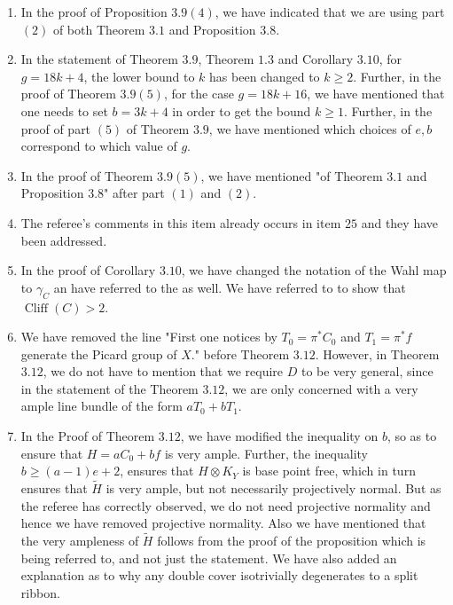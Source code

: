 \documentclass[11pt,twoside]{amsart}
\theoremstyle{plain}
\numberwithin{equation}{section}
\theoremstyle{definition}
\begin{document}
\begin{enumerate}
\item[$(24)$] In the proof of Proposition $3.9 (4)$, we have indicated that we are using part $(2)$ of both Theorem $3.1$ and Proposition $3.8$.   

\item[$(25)$] In the statement of Theorem $3.9$, Theorem $1.3$ and Corollary $3.10$, for $g = 18k+4$, the lower bound to $k$ has been changed to $k \geq 2$. Further, in the proof of Theorem $3.9 (5)$, for the case $g = 18k+16$, we have mentioned that one needs to set $b = 3k+4$ in order to get the bound $k \geq 1$. Further, in the proof of part $(5)$ of Theorem $3.9$, we have mentioned which choices of $e, b$ correspond to which value of $g$. 

\item[$(26)$] In the proof of Theorem $3.9(5)$, we have mentioned "of Theorem $3.1$ and Proposition $3.8$" after part $(1)$ and $(2)$.  

\item[$(27)$] The referee's comments in this item already occurs in item $25$ and they have been addressed. 

\item[$(28)$] In the proof of Corollary $3.10$, we have changed the notation of the Wahl map to $\gamma_C$ an have referred to the \cite[$2.2.1$]{CDS20} as well. We have referred to \cite[Lemma $8.3$]{K01} to show that $\operatorname{Cliff}(C) > 2$. 

\item[$(29)$] We have removed the line "First one notices by $T_0 = \pi^*C_0$ and $T_1 = \pi^*f$ generate the Picard group of $X$." before Theorem $3.12$. However, in Theorem $3.12$, we do not have to mention that we require $D$ to be very general, since in the statement of the Theorem $3.12$, we are only concerned with a very ample line bundle of the form $aT_0+bT_1$.

\item[$(30)$] In the Proof of Theorem $3.12$, we have modified the inequality on $b$, so as to ensure that $H = aC_0+bf$ is very ample. Further, the inequality $b \geq (a-1)e+2$, ensures that $H \otimes K_Y$ is base point free, which in turn ensures that $\widetilde{H}$ is very ample, but not necessarily projectively normal. But as the referee has correctly observed, we do not need projective normality and hence we have removed projective normality. Also we have mentioned that the very ampleness of $\widetilde{H}$ follows from the proof of the proposition which is being referred to, and not just the statement. We have also added an explanation as to why any double cover isotrivially degenerates to a split ribbon. 


\end{enumerate}
\end{document}
